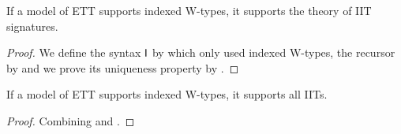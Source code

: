 \begin{theorem}\label{thm:WToToS}
  If a model of ETT supports indexed W-types, it supports the theory
  of IIT signatures.
\end{theorem}
\begin{proof}
  We define the syntax $\mathsf{I}$ by  which only used
  indexed W-types, the recursor by  and we prove its
  uniqueness property by .
\end{proof}

\begin{corollary}\label{thm:WToIITs}
  If a model of ETT supports indexed W-types, it supports all IITs.
\end{corollary}
\begin{proof}
  Combining  and .
\end{proof}

